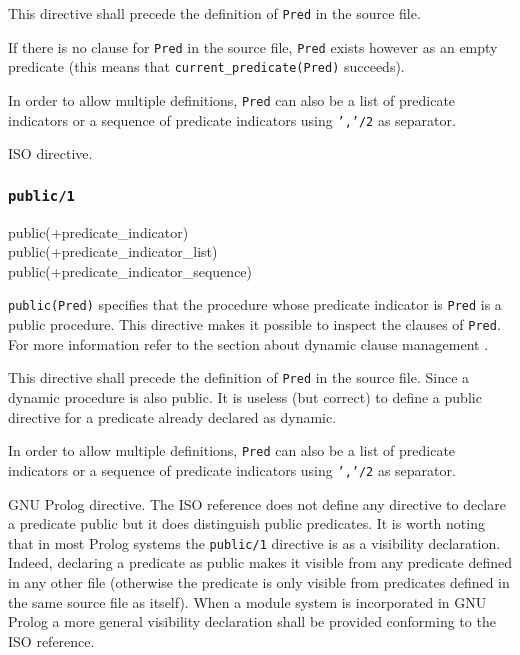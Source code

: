 This directive shall precede the definition of \texttt{Pred} in the source
file.

If there is no clause for \texttt{Pred} in the source file, \texttt{Pred}
exists however as an empty predicate (this means that
\texttt{current\_predicate(Pred)} succeeds).

In order to allow multiple definitions, \texttt{Pred} can also be a list of
predicate indicators or a sequence of predicate indicators using
\texttt{','/2} as separator.

\Portability

ISO directive.

\subsubsection{\texttt{public/1}}
\label{public/1}

\begin{TemplatesOneCol}
public(+predicate\_indicator)\\
public(+predicate\_indicator\_list)\\
public(+predicate\_indicator\_sequence)

\end{TemplatesOneCol}

\Description

\texttt{public(Pred)} specifies that the procedure whose predicate indicator
is \texttt{Pred} is a public procedure. This directive makes it possible to
inspect the clauses of \texttt{Pred}. For more information refer to the
section about dynamic clause management .

This directive shall precede the definition of \texttt{Pred} in the source
file. Since a dynamic procedure is also public. It is useless (but correct)
to define a public directive for a predicate already declared as dynamic.

In order to allow multiple definitions, \texttt{Pred} can also be a list of
predicate indicators or a sequence of predicate indicators using
\texttt{','/2} as separator.

\Portability

GNU Prolog directive. The ISO reference does not define any directive to
declare a predicate public but it does distinguish public predicates. It is
worth noting that in most Prolog systems the \texttt{public/1} directive is
as a visibility declaration. Indeed, declaring a predicate as public makes
it visible from any predicate defined in any other file (otherwise the
predicate is only visible from predicates defined in the same source file as
itself). When a module system is incorporated in GNU Prolog a more general
visibility declaration shall be provided conforming to the ISO reference.

